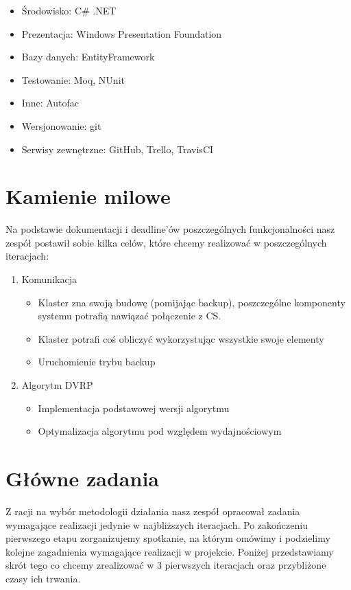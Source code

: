 \documentclass[a4paper]{article}
\begin{document}
	\begin{itemize}
		\item Środowisko: C\# .NET
		\item Prezentacja: Windows Presentation Foundation
		\item Bazy danych: EntityFramework
		\item Testowanie: Moq, NUnit
		\item Inne: Autofac
		\item Wersjonowanie: git
		\item Serwisy zewnętrzne: GitHub, Trello, TravisCI
	\end{itemize}
	
	\section{Kamienie milowe}
	Na podstawie dokumentacji i deadline'ów poszczególnych funkcjonalności nasz zespół 
	postawił sobie kilka celów, które chcemy realizować w poszczególnych iteracjach:
	\begin{enumerate}
		\item Komunikacja
		\begin{itemize}
			\item Klaster zna swoją budowę (pomijając backup), poszczególne komponenty systemu potrafią nawiązać połączenie z CS.
		\item Klaster potrafi coś obliczyć wykorzystując wszystkie swoje elementy
		\item Uruchomienie trybu backup
		\end{itemize}
		\item Algorytm DVRP
			\begin{itemize}
				\item Implementacja podstawowej wersji algorytmu
				\item Optymalizacja algorytmu pod względem wydajnościowym
			\end{itemize}		
	\end{enumerate}
	
	\section{Główne zadania}
		Z racji na wybór metodologii działania nasz zespół opracował zadania wymagające realizacji jedynie w najbliższych iteracjach. Po zakończeniu pierwszego etapu zorganizujemy spotkanie, na którym omówimy i podzielimy kolejne zagadnienia wymagające realizacji w projekcie. Poniżej przedstawiamy skrót tego co chcemy zrealizować w 3 pierwszych iteracjach oraz przybliżone czasy ich trwania.
		
\end{document}
